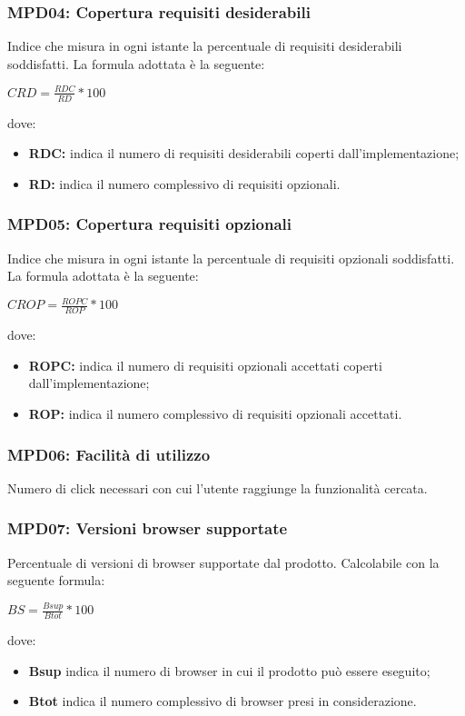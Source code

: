 \subsubsection{MPD04: Copertura requisiti desiderabili}
Indice che misura in ogni istante la percentuale di requisiti desiderabili soddisfatti.
La formula adottata è la seguente:
\begin{center}
    $CRD = \displaystyle \frac{RDC}{RD}*100$
\end{center}
dove:
\begin{itemize}
    \item \textbf{RDC:} indica il numero di requisiti desiderabili coperti dall'implementazione;
    \item \textbf{RD:} indica il numero complessivo di requisiti opzionali.
\end{itemize}

\subsubsection{MPD05: Copertura requisiti opzionali}
Indice che misura in ogni istante la percentuale di requisiti opzionali soddisfatti.
La formula adottata è la seguente:
\begin{center}
    $CROP = \displaystyle \frac{ROPC}{ROP}*100$
\end{center}
dove:
\begin{itemize}
    \item \textbf{ROPC:} indica il numero di requisiti opzionali accettati coperti dall'implementazione;
    \item \textbf{ROP:} indica il numero complessivo di requisiti opzionali accettati.
\end{itemize}

\subsubsection{MPD06: Facilità di utilizzo}
Numero di click necessari con cui l'utente raggiunge la funzionalità cercata.

\subsubsection{MPD07: Versioni browser supportate}
Percentuale di versioni di browser supportate dal prodotto.
Calcolabile con la seguente formula:
\begin{center}
    $BS = \displaystyle \frac{Bsup}{Btot}*100$
\end{center}
dove:
\begin{itemize}
    \item \textbf{Bsup} indica il numero di browser in cui il prodotto può essere eseguito;
    \item \textbf{Btot} indica il numero complessivo di browser presi in considerazione.
\end{itemize}

